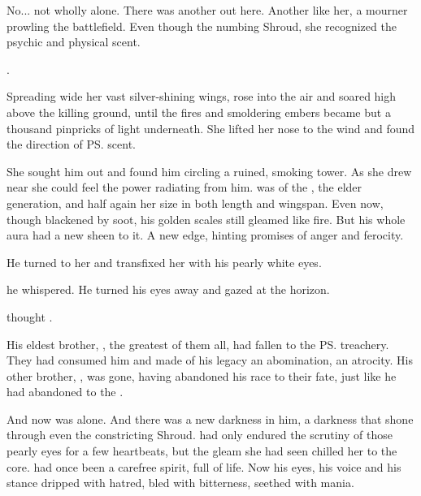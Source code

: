 No... not wholly alone. 
There was another out here. 
Another like her, a mourner prowling the battlefield. 
Even though the numbing Shroud, she recognized the psychic and physical scent. 

. 

%     

Spreading wide her vast silver-shining wings, \Cryocas{} rose into the air and soared high above the killing ground, until the fires and smoldering embers became but a thousand pinpricks of light underneath. 
She lifted her nose to the wind and found the direction of \ps{\Secherdamon}{} scent. 

She sought him out and found him circling a ruined, smoking tower. 
As she drew near she could feel the power radiating from him. 
\Secherdamon{} was of the , the elder generation, and half again her size in both length and wingspan. 
Even now, though blackened by soot, his golden scales still gleamed like fire. 
But his whole aura had a new sheen to it. 
A new edge, hinting promises of anger and ferocity. 

He turned to her and transfixed her with his pearly white eyes. 

he whispered. 
He turned his eyes away and gazed at the horizon. 

 thought \Cryocas. 

His eldest brother, , the greatest of them all, had fallen to the \ps{\resphain} treachery. 
They had consumed him and made of his legacy an abomination, an atrocity. 
His other brother, , was gone, having abandoned his race to their fate, just like he had abandoned \Nexagglachel{} to the \resphain. 

And now \IrocasSecherdamon{} was alone. 
And there was a new darkness in him, a darkness that shone through even the constricting Shroud. 
\Cryocas{} had only endured the scrutiny of those pearly eyes for a few heartbeats, but the gleam she had seen chilled her to the core. 
\Secherdamon{} had once been a carefree spirit, full of life. 
Now his eyes, his voice and his stance dripped with hatred, bled with bitterness, seethed with mania. 

